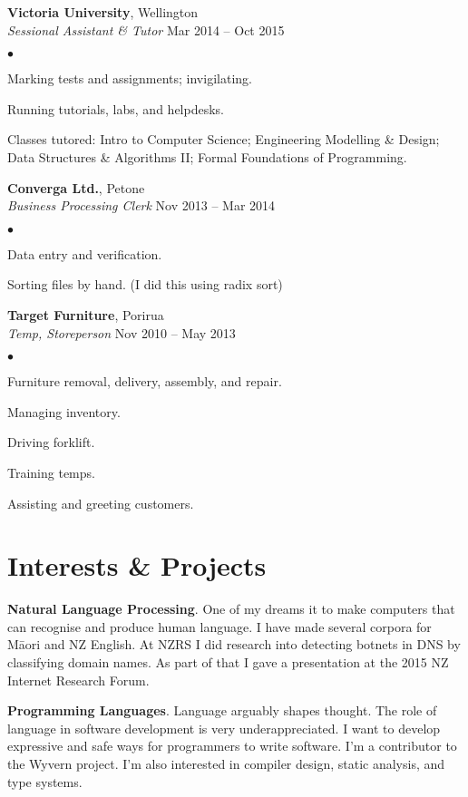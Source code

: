 \documentclass[margin,line]{res}
\newenvironment{list2}{
  \begin{list}{$\bullet$}{%
      \setlength{\itemsep}{0in}
      \setlength{\parsep}{0in} \setlength{\parskip}{0in}
      \setlength{\topsep}{0in} \setlength{\partopsep}{0in}
      \setlength{\leftmargin}{0.2in}}}
  {\end{list}}
\begin{document}
\begin{resume}
    {\bf Victoria University}, Wellington\\
    {\em Sessional Assistant \& Tutor} \hfill {Mar 2014 -- Oct 2015}
    \begin{list2}
	\item Marking tests and assignments; invigilating.
	\item Running tutorials, labs, and helpdesks.
	\item Classes tutored: Intro to Computer Science; Engineering Modelling \& Design; Data Structures \& Algorithms 				II; Formal Foundations of Programming.
    \end{list2}

  {\bf Converga Ltd.}, Petone\\
  {\em Business Processing Clerk} \hfill {Nov 2013 -- Mar 2014}
  \begin{list2} %
	\item Data entry and verification.
	\item Sorting files by hand. (I did this using radix sort)
  \end{list2}

  {\bf Target Furniture}, Porirua\\
  {\em Temp, Storeperson} \hfill{Nov 2010 -- May 2013}
  \begin{list2} %
	\item Furniture removal, delivery, assembly, and repair. 
	\item Managing inventory.
	\item Driving forklift.
	\item Training temps.
	\item Assisting and greeting customers.
  \end{list2}


\section{\sc Interests \& Projects}

{\bf Natural Language Processing}. One of my dreams it to make computers that can recognise and produce human language. I have made several corpora for M\=aori and NZ English. At NZRS I did research into detecting botnets in DNS by classifying domain names. As part of that I gave a presentation at the 2015 NZ Internet Research Forum.

{\bf Programming Languages}. Language arguably shapes thought. The role of language in software development is very underappreciated. I want to develop expressive and safe ways for programmers to write software. I'm a contributor to the Wyvern project. I'm also interested in compiler design, static analysis, and type systems.


\end{resume}
\end{document}
